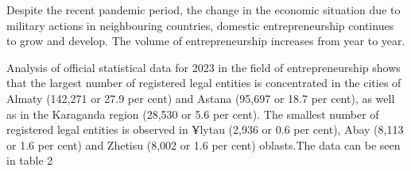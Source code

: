 \begin{multicols}{2}
Despite the recent pandemic period, the change in the economic situation
due to military actions in neighbouring countries, domestic
entrepreneurship continues to grow and develop. The volume of
entrepreneurship increases from year to year.

Analysis of official statistical data for 2023 in the field of
entrepreneurship shows that the largest number of registered legal
entities is concentrated in the cities of Almaty (142,271 or 27.9 per
cent) and Astana (95,697 or 18.7 per cent), as well as in the Karaganda
region (28,530 or 5.6 per cent). The smallest number of registered legal
entities is observed in Ұlytau (2,936 or 0.6 per cent), Abay (8,113 or
1.6 per cent) and Zhetisu (8,002 or 1.6 per cent) oblasts.The data can
be seen in table 2
\end{multicols}

